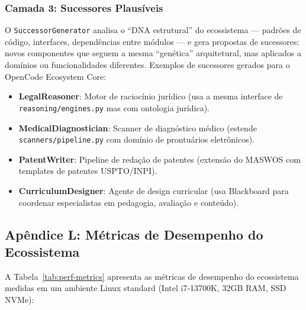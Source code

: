 \subsubsection{Camada 3: Sucessores Plausíveis}

O \texttt{SuccessorGenerator} analisa o ``DNA estrutural'' do ecossistema — padrões de código, interfaces, dependências entre módulos — e gera propostas de sucessores: novos componentes que seguem a mesma ``genética'' arquitetural, mas aplicados a domínios ou funcionalidades diferentes. Exemplos de sucessores gerados para o OpenCode Ecosystem Core:

\begin{itemize}
  \item \textbf{LegalReasoner}: Motor de raciocínio jurídico (usa a mesma interface de \texttt{reasoning/engines.py} mas com ontologia jurídica).
  \item \textbf{MedicalDiagnostician}: Scanner de diagnóstico médico (estende \texttt{scanners/pipeline.py} com domínio de prontuários eletrônicos).
  \item \textbf{PatentWriter}: Pipeline de redação de patentes (extensão do MASWOS com templates de patentes USPTO/INPI).
  \item \textbf{CurriculumDesigner}: Agente de design curricular (usa Blackboard para coordenar especialistas em pedagogia, avaliação e conteúdo).
\end{itemize}

\subsection{Apêndice L: Métricas de Desempenho do Ecossistema}
\label{sec:apendice-metricas}

A Tabela~\ref{tab:perf-metrics} apresenta as métricas de desempenho do ecossistema medidas em um ambiente Linux standard (Intel i7-13700K, 32GB RAM, SSD NVMe):

